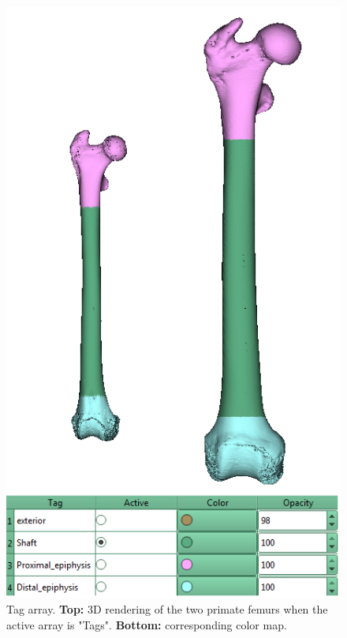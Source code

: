 \documentclass[12pt, a4paper]{book}
\begin{document}
\begin{figure}
  \centering
  \includegraphics[scale=0.5]{Tags.png}
\caption{Tag array. \textbf{Top:} 3D rendering of the two primate femurs when the active array is "Tags". \textbf{Bottom:} corresponding color map. }	
\label{tags}
 \end{figure}
\end{document}
